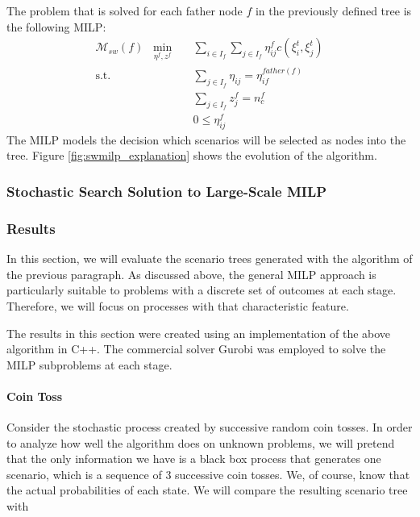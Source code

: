 \documentclass[a4paper, 12pt] {article}
\begin{document}
The problem that is solved for each father node $f$ in the previously defined tree is the following MILP:
\begin{eqnarray}
  \label{eq:small-milp-in-alg}
  \mathcal{M}_{sw}(f)\; \; \min_{\eta^f,z^f}&&\sum_{i\in I_f}\sum_{j\in I_f}\eta_{ij}^fc(\xi_i^t,\xi_j^t)\\
  \mathrm{s.t.}&&\sum_{j\in I_f}\eta_{ij} = \eta_{if}^{father(f)}\\
  &&\sum_{j\in I_f}z_j^f = n_c^f\\
  &&0\leq \eta_{ij}^f
\end{eqnarray}
The MILP models the decision which scenarios will be selected as nodes into the tree. Figure \ref{fig:swmilp_explanation} shows the evolution of the algorithm.

\subsubsection{Stochastic Search Solution to Large-Scale MILP}
\subsubsection{Results}
In this section, we will evaluate the scenario trees generated with the algorithm of the previous paragraph. As discussed above, the general MILP approach is particularly suitable to problems with a discrete set of outcomes at each stage. Therefore, we will focus on processes with that characteristic feature.

The results in this section were created using an implementation of the above algorithm in C++. The commercial solver Gurobi was employed to solve the MILP subproblems at each stage.  

\paragraph{Coin Toss} Consider the stochastic process created by successive random coin tosses. In order to analyze how well the algorithm does on unknown problems, we will pretend that the only information we have is a black box process that generates one scenario, which is a sequence of 3 successive coin tosses. We, of course, know that the actual probabilities of each state. We will compare the resulting scenario tree with
\end{document}
